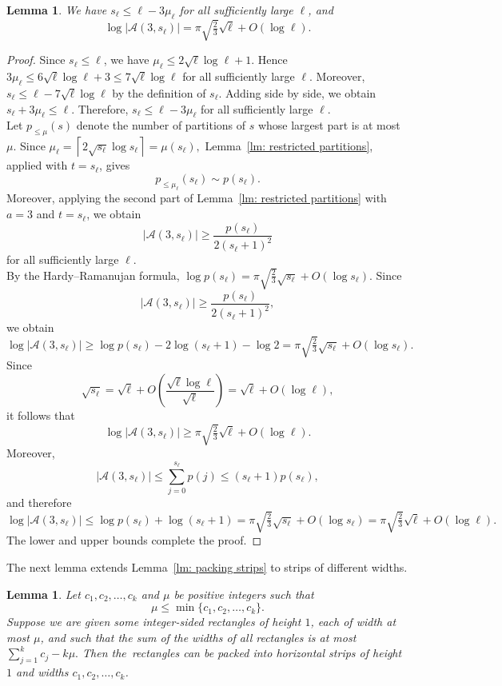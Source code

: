 \documentclass[12pt,a4paper]{amsart}
\numberwithin{equation}{section}
\theoremstyle{plain}
\newtheorem{lm}[thm]{Lemma}
\theoremstyle{definition}
\theoremstyle{remark}
\begin{document}
\begin{lm}\label{lm: restricted partitions p3}
We have
$
s_\ell\le \ell-3\mu_\ell
$
for all sufficiently large $\ell$, and
$$
\log|\mathcal A(3,s_\ell)|
=
\pi\sqrt{\tfrac23}\sqrt\ell+O(\log\ell).
$$
\end{lm}
\begin{proof}
Since $s_\ell\le \ell$, we have
$\mu_\ell\le 2\sqrt{\ell}\log \ell+1.$
Hence
$3\mu_\ell\le 6\sqrt{\ell}\log \ell+3
\le 7\sqrt{\ell}\log \ell$
for all sufficiently large $\ell$. Moreover,
$s_\ell\le \ell-7\sqrt{\ell}\log \ell$ by the definition of $s_\ell$.
Adding side by side, we obtain
$s_\ell+3\mu_\ell\le \ell.$ Therefore, $s_\ell\le  \ell-3\mu_\ell$ for all sufficiently large $\ell$.\\
Let $p_{\leq\mu}(s)$ denote the number of partitions of $s$ whose largest part is at most $\mu$. 
Since
$
\mu_\ell=\left\lceil2\sqrt{s_\ell}\log s_\ell\right\rceil=\mu(s_\ell),
$
Lemma~\ref{lm: restricted partitions}, applied with $t=s_\ell$, gives
$$
p_{\leq\mu_\ell}(s_\ell)\sim p(s_\ell).
$$
Moreover, applying the second part of Lemma~\ref{lm: restricted partitions} with $a=3$ and $t=s_\ell$, we obtain
$$
|\mathcal A(3,s_\ell)|
\geq
\frac{p(s_\ell)}{2(s_\ell+1)^2}
$$
for all sufficiently large $\ell$.\\
By the Hardy--Ramanujan formula,
$
\log p(s_\ell)
=
\pi\sqrt{\tfrac23}\sqrt{s_\ell}
+O(\log s_\ell).
$
Since
$$
|\mathcal A(3,s_\ell)|
\ge
\frac{p(s_\ell)}{2(s_\ell+1)^2},
$$
we obtain
$$
\log|\mathcal A(3,s_\ell)|
\ge
\log p(s_\ell)-2\log(s_\ell+1)-\log2
=
\pi\sqrt{\tfrac23}\sqrt{s_\ell}
+O(\log s_\ell).
$$
Since
$$
\sqrt{s_\ell}
=
\sqrt{\ell}
+O\!\left(\frac{\sqrt{\ell}\log\ell}{\sqrt{\ell}}\right)
=
\sqrt{\ell}
+O(\log\ell),
$$
it follows that
$$
\log|\mathcal A(3,s_\ell)|
\ge
\pi\sqrt{\tfrac23}\sqrt{\ell}
+O(\log\ell).
$$
Moreover,
$$
|\mathcal A(3,s_\ell)|
\le
\sum_{j=0}^{s_\ell}p(j)
\le
(s_\ell+1)p(s_\ell),
$$
and therefore
$$
\log|\mathcal A(3,s_\ell)|
\le
\log p(s_\ell)+\log(s_\ell+1)
=
\pi\sqrt{\tfrac23}\sqrt{s_\ell}
+O(\log s_\ell)
=
\pi\sqrt{\tfrac23}\sqrt{\ell}
+O(\log\ell).
$$
The lower and upper bounds complete the proof.
\end{proof}
The next lemma extends Lemma~\ref{lm: packing strips} to strips of different widths.
\begin{lm}\label{lm: unequal strips packing}
Let $c_1,c_2,\ldots,c_k$ and $\mu$ be positive integers such that
$$
\mu\le \min\{c_1,c_2,\ldots,c_k\}.
$$
Suppose we are given some integer-sided rectangles of height $1$, each of width at most $\mu$, and such that the sum of the widths of all rectangles is at most
$
\sum_{j=1}^{k}c_j-k\mu.
$
Then the~rectangles can be packed into horizontal strips of height $1$ and widths $c_1,c_2,\ldots,c_k$.
\end{lm}
\end{document}
